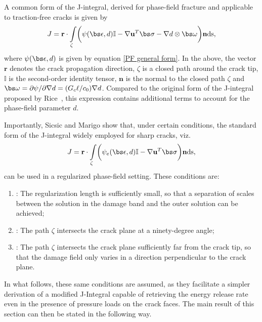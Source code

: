 A common form of the J-integral, derived for phase-field fracture and applicable to traction-free cracks is given by \cite{sicsic2013gradient,ballarini2016closed} 
\begin{equation}
    J = \textbf{r} \cdot \int\limits_{\zeta} \biggl( \psi(\bs\epsilon, d)\mathbb{I} - \nabla \textbf{u}^T\bs \sigma-\nabla d \otimes \bs\omega \biggr) \textbf{n}\text{ds}, 
\end{equation}
where $\psi(\bs\epsilon, d)$ is given by equation \eqref{PF general form}. In the above, the vector $\textbf{r}$ denotes the crack propagation direction, $\zeta$ is a closed path around the crack tip, $\mathbb{I}$ is the second-order identity tensor, $\textbf{n}$ is the normal to the closed path $\zeta$ and $\bs\omega = \partial \psi/\partial \nabla d = (G_c\ell/c_0)\nabla d$. Compared to the original form of the J-integral proposed by Rice~\cite{rice1968mathematical,rice1968path}, this expression contains additional terms to account for the phase-field parameter $d$. 

Importantly,  Sicsic and Marigo \cite{sicsic2013gradient} show that, under certain conditions, the standard form of the J-integral widely employed for sharp cracks, viz.
\begin{equation}
    J = \textbf{r} \cdot \int\limits_{\zeta} \biggl( \psi_e(\bs\epsilon, d)\mathbb{I} - \nabla \textbf{u}^T\bs \sigma\biggr) \textbf{n}\text{ds},
\end{equation}
 can be used in a regularized phase-field setting. These conditions are:

\begin{enumerate}[start=1,label={\bfseries H\arabic*}]
    \item \label{itm:hyp1}: The regularization length is sufficiently small, so that a separation of scales between the solution in the damage band and the outer solution can be achieved;

    \item \label{itm:hyp2}: The path $\zeta$ intersects the crack plane at a ninety-degree angle;

    \item \label{itm:hyp3}: The path $\zeta$ intersects the crack plane sufficiently far from the crack tip, so that the damage field only varies in a direction perpendicular to the crack plane.   
\end{enumerate}

\noindent In what follows, these same conditions are assumed, as they facilitate a simpler derivation of a modified J-Integral capable of retrieving the energy release rate even in the presence of pressure loads on the crack faces. The main result of this section can then be stated in the following way.

